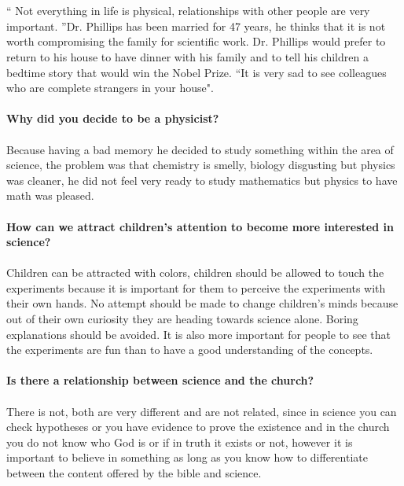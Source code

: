 \documentclass[10pt,letterpaper]{article}
\begin{document}
\\
\\
`` Not everything in life is physical, relationships with other people are very important. ”Dr. Phillips has been married for 47 years, he thinks that it is not worth compromising the family for scientific work. Dr. Phillips would prefer to return to his house to have dinner with his family and to tell his children a bedtime story that would win the Nobel Prize. ``It is very sad to see colleagues who are complete strangers in your house".
\\
\\
\textbf{Why did you decide to be a physicist?}
\\
\\
Because having a bad memory he decided to study something within the area of science, the problem was that chemistry is smelly, biology disgusting but physics was cleaner, he did not feel very ready to study mathematics but physics to have math was pleased.
\\
\\
\textbf{How can we attract children's attention to become more interested in science?}
\\
\\
Children can be attracted with colors, children should be allowed to touch the experiments because it is important for them to perceive the experiments with their own hands. No attempt should be made to change children's minds because out of their own curiosity they are heading towards science alone. Boring explanations should be avoided. It is also more important for people to see that the experiments are fun than to have a good understanding of the concepts. 
\\
\\
\textbf{Is there a relationship between science and the church?}
\\
\\
There is not, both are very different and are not related, since in science you can check hypotheses or you have evidence to prove the existence and in the church you do not know who God is or if in truth it exists or not, however it is important to believe in something as long as you know how to differentiate between the content offered by the bible and science. 
\\
\\
\end{document}
